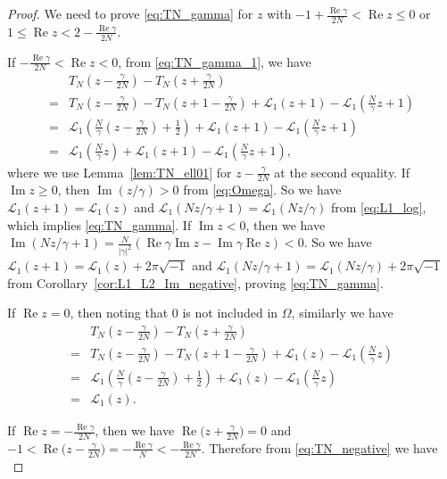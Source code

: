 \documentclass[a4paper,dvipdfmx]{amsart}
\theoremstyle{plain}
\theoremstyle{definition}
\theoremstyle{remark}
\renewcommand{\L}{\mathcal{L}}
\renewcommand{\Re}{\operatorname{Re}}
\renewcommand{\Im}{\operatorname{Im}}
\renewcommand{\i}{\sqrt{-1}}
\numberwithin{equation}{section}
\begin{document}
\begin{proof}
We need to prove \eqref{eq:TN_gamma} for $z$ with $-1+\frac{\Re\gamma}{2N}<\Re{z}\le0$ or $1\le\Re{z}<2-\frac{\Re\gamma}{2N}$.
\par
If $-\frac{\Re\gamma}{2N}<\Re{z}<0$, from \eqref{eq:TN_gamma_1}, we have
\begin{align*}
  &T_{N}\left(z-\frac{\gamma}{2N}\right)
  -
  T_{N}\left(z+\frac{\gamma}{2N}\right)
  \\
  =&
  T_{N}\left(z-\frac{\gamma}{2N}\right)
  -
  T_{N}\left(z+1-\frac{\gamma}{2N}\right)
  +
  \L_1(z+1)
  -
  \L_1\left(\frac{N}{\gamma}z+1\right)
  \\
  =&
  \L_1\left(\frac{N}{\gamma}\left(z-\frac{\gamma}{2N}\right)+\frac{1}{2}\right)
  +
  \L_1(z+1)
  -
  \L_1\left(\frac{N}{\gamma}z+1\right)
  \\
  =&
  \L_1\left(\frac{N}{\gamma}z\right)
  +
  \L_1(z+1)
  -
  \L_1\left(\frac{N}{\gamma}z+1\right),
\end{align*}
where we use Lemma~\ref{lem:TN_ell01} for $z-\frac{\gamma}{2N}$ at the second equality.
If $\Im{z}\ge0$, then $\Im(z/\gamma)>0$ from \eqref{eq:Omega}.
So we have $\L_1(z+1)=\L_1(z)$ and $\L_1(Nz/\gamma+1)=\L_1(Nz/\gamma)$ from \eqref{eq:L1_log}, which implies \eqref{eq:TN_gamma}.
If $\Im{z}<0$, then we have $\Im(Nz/\gamma+1)=\frac{N}{|\gamma|^2}(\Re\gamma\Im{z}-\Im\gamma\Re{z})<0$.
So we have $\L_1(z+1)=\L_1(z)+2\pi\i$ and $\L_1(Nz/\gamma+1)=\L_1(Nz/\gamma)+2\pi\i$ from Corollary~\ref{cor:L1_L2_Im_negative}, proving \eqref{eq:TN_gamma}.
\par
If $\Re{z}=0$, then noting that $0$ is not included in $\Omega$, similarly we have
\begin{align*}
  &T_{N}\left(z-\frac{\gamma}{2N}\right)
  -
  T_{N}\left(z+\frac{\gamma}{2N}\right)
  \\
  =&
  T_{N}\left(z-\frac{\gamma}{2N}\right)
  -
  T_{N}\left(z+1-\frac{\gamma}{2N}\right)
  +
  \L_1(z)
  -
  \L_1\left(\frac{N}{\gamma}z\right)
  \\
  =&
  \L_1\left(\frac{N}{\gamma}\left(z-\frac{\gamma}{2N}\right)+\frac{1}{2}\right)
  +
  \L_1(z)
  -
  \L_1\left(\frac{N}{\gamma}z\right)
  \\
  =&
  \L_1(z).
\end{align*}
\par
If $\Re{z}=-\frac{\Re\gamma}{2N}$, then we have $\Re\bigl(z+\frac{\gamma}{2N}\bigr)=0$ and $-1<\Re\bigl(z-\frac{\gamma}{2N}\bigr)=-\frac{\Re\gamma}{N}<-\frac{\Re\gamma}{2N}$.
Therefore from \eqref{eq:TN_negative} we have
\begin{equation}\label{eq:Rez_gamma/2N}

\end{equation}
\end{proof}
\end{document}
